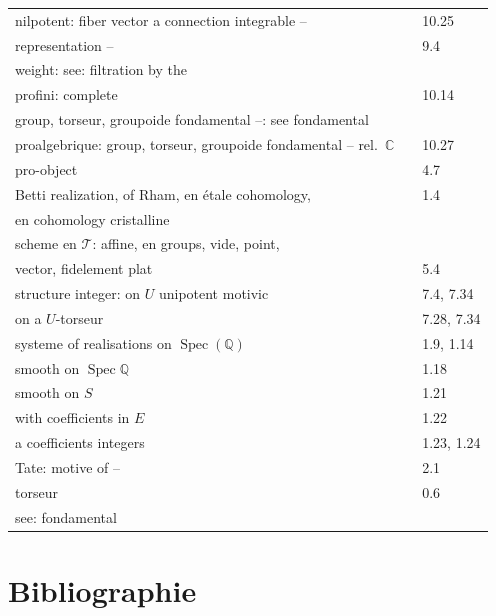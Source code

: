 \documentclass[12pt,a4paper]{article}
\theoremstyle{plain}
\theoremstyle{definition}
\theoremstyle{remark}
\DeclareMathOperator{\Spec}{Spec}
\newcommand{\QQ}{\mathbb{Q}}
\newcommand{\CC}{\mathbb{C}}
\begin{document}
\begin{tabular}{lll}
nilpotent: fiber vector a connection integrable -- & & 10.25 \\
\quad representation -- & & 9.4 \\
weight: see: filtration by the & & \\
profini: complete & & 10.14 \\
group, torseur, groupoide fondamental --: see fondamental & & \\
proalgebrique: group, torseur, groupoide fondamental -- rel.\ $\CC$ & & 10.27 \\
pro-object & & 4.7 \\
Betti realization, of Rham, en étale cohomology, & & 1.4 \\
\quad en cohomology cristalline & & \\
scheme en $\mathcal{T}$: affine, en groups, vide, point, & & \\
\quad vector, fidelement plat & & 5.4 \\
structure integer: on $U$ unipotent motivic & & 7.4, 7.34 \\
\quad on a $U$-torseur & & 7.28, 7.34 \\
systeme of realisations on $\Spec(\QQ)$ & & 1.9, 1.14 \\
\quad smooth on $\Spec \QQ$ & & 1.18 \\
\quad smooth on $S$ & & 1.21 \\
\quad with coefficients in $E$ & & 1.22 \\
\quad a coefficients integers & & 1.23, 1.24 \\
Tate: motive of -- & & 2.1 \\
torseur & & 0.6 \\
\quad see: fondamental & & \\
\end{tabular}

\newpage
\section*{Bibliographie}
\end{document}
